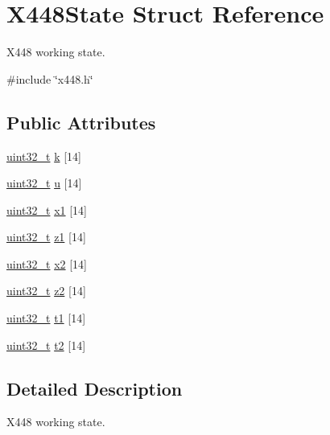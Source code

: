 \hypertarget{structX448State}{}\section{X448\+State Struct Reference}
\label{structX448State}


X448 working state.  




{\ttfamily \#include \char`\"{}x448.\+h\char`\"{}}

\subsection*{Public Attributes}
\begin{DoxyCompactItemize}
\item 
\hyperlink{stdint_8h_a435d1572bf3f880d55459d9805097f62}{uint32\+\_\+t} \hyperlink{structX448State_a596780b22e97d281d46127df4e9aed1f}{k} \mbox{[}14\mbox{]}
\item 
\hyperlink{stdint_8h_a435d1572bf3f880d55459d9805097f62}{uint32\+\_\+t} \hyperlink{structX448State_a7e8c8bcd6718ccf02616c415eb1d8a8c}{u} \mbox{[}14\mbox{]}
\item 
\hyperlink{stdint_8h_a435d1572bf3f880d55459d9805097f62}{uint32\+\_\+t} \hyperlink{structX448State_a97014ace9f623a1ca53a7997a9c3651d}{x1} \mbox{[}14\mbox{]}
\item 
\hyperlink{stdint_8h_a435d1572bf3f880d55459d9805097f62}{uint32\+\_\+t} \hyperlink{structX448State_a8575219540e051b3de1cbf809e1e27ac}{z1} \mbox{[}14\mbox{]}
\item 
\hyperlink{stdint_8h_a435d1572bf3f880d55459d9805097f62}{uint32\+\_\+t} \hyperlink{structX448State_a5c14a6c35df396ac024a2a9a4071f884}{x2} \mbox{[}14\mbox{]}
\item 
\hyperlink{stdint_8h_a435d1572bf3f880d55459d9805097f62}{uint32\+\_\+t} \hyperlink{structX448State_a5347ad257da43817a6c521a0a383eb14}{z2} \mbox{[}14\mbox{]}
\item 
\hyperlink{stdint_8h_a435d1572bf3f880d55459d9805097f62}{uint32\+\_\+t} \hyperlink{structX448State_a92dd1b576748a0dc26a0ed15a8ca3cd1}{t1} \mbox{[}14\mbox{]}
\item 
\hyperlink{stdint_8h_a435d1572bf3f880d55459d9805097f62}{uint32\+\_\+t} \hyperlink{structX448State_a07f88e49f9a84b704202974ecfd4c190}{t2} \mbox{[}14\mbox{]}
\end{DoxyCompactItemize}


\subsection{Detailed Description}
X448 working state. 

